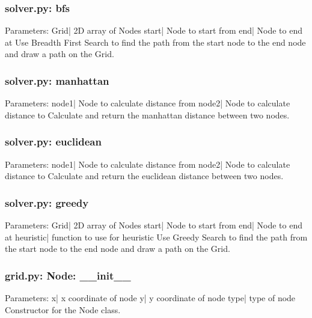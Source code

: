 \documentclass[titlepage]{article}
\begin{document}
\subsubsection{solver.py: bfs}
Parameters:\newline
\indent Grid| 2D array of Nodes\newline
\indent start| Node to start from\newline
\indent end| Node to end at\newline
Use Breadth First Search to find the path from the start node to the end node and draw a path on the Grid.

\subsubsection{solver.py: manhattan}
Parameters:\newline
\indent node1| Node to calculate distance from\newline
\indent node2| Node to calculate distance to\newline
Calculate and return the manhattan distance between two nodes.

\subsubsection{solver.py: euclidean}
Parameters:\newline
\indent node1| Node to calculate distance from\newline
\indent node2| Node to calculate distance to\newline
Calculate and return the euclidean distance between two nodes.

\subsubsection{solver.py: greedy}
Parameters:\newline
\indent Grid| 2D array of Nodes\newline
\indent start| Node to start from\newline
\indent end| Node to end at\newline
\indent heuristic| function to use for heuristic\newline
Use Greedy Search to find the path from the start node to the end node and draw a path on the Grid.

\subsubsection{grid.py: Node: \_\_init\_\_}
Parameters:\newline
\indent x| x coordinate of node\newline
\indent y| y coordinate of node\newline
\indent type| type of node\newline
Constructor for the Node class.
\end{document}
